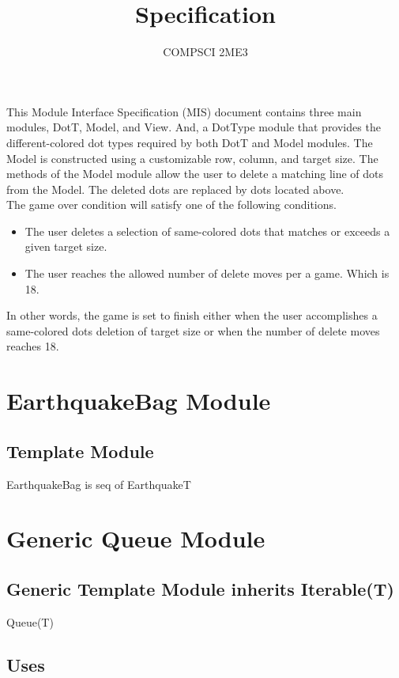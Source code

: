 \documentclass[12pt]{article}
\title{Specification}
\author{COMPSCI 2ME3}
\begin{document}
\maketitle
This Module Interface Specification (MIS) document contains three main modules, DotT, Model,
and View. And, a DotType module that provides the different-colored dot types required by both DotT 
and Model modules. The Model is constructed using a customizable row, column, and target size.
The methods of the Model module allow the user to delete a matching line of 
dots from the Model. The deleted dots are replaced by dots located above.\\

\noindent The game over condition will satisfy one of the following conditions.
\begin{itemize}
\item The user deletes a selection of same-colored dots that matches or exceeds a given target size.
\item The user reaches the allowed number of delete moves per a game. Which is 18.
\end{itemize}
In other words, the game is set to finish either when the user accomplishes a same-colored dots 
deletion of target size or when the number of delete moves reaches 18.

\newpage

\section* {EarthquakeBag Module}

\subsection*{Template Module}

EarthquakeBag is seq of EarthquakeT

\newpage

\section* {Generic Queue Module}

\subsection*{Generic Template Module inherits Iterable(T)}

Queue(T)

\subsection* {Uses}
\end{document}
